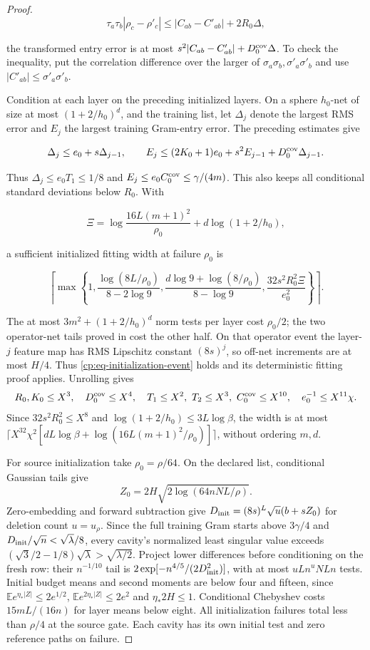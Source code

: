 \begin{proof}
\[
\tau_a\tau_b|\rho_c-\rho'_c|
 \le|C_{ab}-C'_{ab}|+2R_0\Delta,
\]

the transformed entry error is at most
$s^2|C_{ab}-C'_{ab}|+D_0^{\rm cov}\Delta$.
To check the inequality, put the correlation difference over the larger
of $\sigma_a\sigma_b,\sigma'_a\sigma'_b$ and use
$|C'_{ab}|\le\sigma'_a\sigma'_b$.

Condition at each layer on the preceding initialized layers. On a sphere
$h_0$-net of size at most $(1+2/h_0)^d$, and the training list, let
$\Delta_j$ denote the largest RMS error and $E_j$ the largest training
Gram-entry error. The preceding estimates give

\[
\Delta_j\le e_0+s\Delta_{j-1},\qquad
E_j\le(2K_0+1)e_0+s^2E_{j-1}+D_0^{\rm cov}\Delta_{j-1}.
\]

Thus $\Delta_j\le e_0T_1\le1/8$ and
$E_j\le e_0C_0^{\rm cov}\le\gamma/(4m)$. This also keeps all
conditional standard deviations below $R_0$.
With

\[
\Xi=\log\frac{16L(m+1)^2}{\rho_0}
                 +d\log(1+2/h_0),
\]

a sufficient initialized fitting width at failure $\rho_0$ is

\begin{equation}
\left\lceil\max\left\{1,
 \frac{\log(8L/\rho_0)}{8-2\log9},
 \frac{d\log9+\log(8/\rho_0)}{8-\log9},
 \frac{32s^2R_0^2\Xi}{e_0^2}\right\}\right\rceil.
\label{cp:poly:eq:initialization}
\end{equation}

The at most $3m^2+(1+2/h_0)^d$ norm tests per layer cost
$\rho_0/2$; the two operator-net tails proved in 
cost the other half. On that operator event the layer-$j$ feature map
has RMS Lipschitz constant $(8s)^j$, so off-net increments are at
most $H/4$. Thus \eqref{cp:eq-initialization-event} holds and its
deterministic fitting proof applies. Unrolling gives
\[
R_0,K_0\le X^3,\quad D_0^{\rm cov}\le X^4,\quad
T_1\le X^2,\ T_2\le X^3,\ C_0^{\rm cov}\le X^{10},\quad
e_0^{-1}\le X^{11}\chi.
\]
Since $32s^2R_0^2\le X^8$ and
$\log(1+2/h_0)\le3L\log\beta$, the width is at most
$\lceil X^{32}\chi^2[dL\log\beta+\log(16L(m+1)^2/\rho_0)]\rceil$,
without ordering $m,d$.

For source initialization take $\rho_0=\rho/64$.
On the declared list, conditional Gaussian tails give
\[
Z_0=2H\sqrt{2\log(64nNL/\rho)}.
\]
Zero-embedding and forward subtraction give
$D_{\rm init}=(8s)^L\sqrt u(b+sZ_0)$ for deletion count
$u=u_\rho$. Since the full training Gram starts above $3\gamma/4$
and $D_{\rm init}/\sqrt n<\sqrt\lambda/8$, every cavity's normalized
least singular value exceeds
$(\sqrt3/2-1/8)\sqrt\lambda>\sqrt{\lambda/2}$.
Project lower differences before conditioning on the fresh row:
their $n^{-1/10}$ tail is
$2\exp[-n^{4/5}/(2D_{\rm init}^2)]$, with at most $uLn^uNLn$ tests.
Initial budget means and second moments are below four and fifteen,
since $\mathbb E e^{\eta_*|Z|}\le2e^{1/2}$,
$\mathbb E e^{2\eta_*|Z|}\le2e^2$ and $\eta_*2H\le1$.
Conditional Chebyshev costs $15mL/(16n)$ for layer means below eight.
All initialization failures total less than $\rho/4$ at the source gate.
Each cavity has its own initial test and zero reference paths on failure.


\end{proof}
